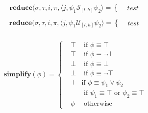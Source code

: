 \documentclass[10pt,a4paper]{article}
\newcommand{\rp}[2]{\ensuremath{\langle #1, #2 \rangle}}
\begin{document}
\begin{align*}
\mathbf{reduce}(\sigma,\tau, i,\pi,\rp{j}{\psi_1 \mathcal{S}_{[l,h]} \psi_2} = \left\{
\begin{aligned}
&test 
\end{aligned} \right. \\
\end{align*}
\begin{align*}
\mathbf{reduce}(\sigma,\tau, i,\pi,\rp{j}{\psi_1 \mathcal{U}_{[l,h]} \psi_2} = \left\{
\begin{aligned}
&test 
\end{aligned} \right. \\
\end{align*}

\begin{align*}
\mathbf{simplify}(\phi) = \left\{
\begin{aligned}
&\top &\text{ if } \phi \equiv \top \\
&\top &\text{ if } \phi \equiv \neg \bot \\
&\bot &\text{ if } \phi \equiv \bot \\
&\bot &\text{ if } \phi \equiv \neg \top \\
&\top &\text {if } \phi \equiv \psi_1 \vee \psi_2 \\
& &\text{ if } \psi_1 \equiv \top \text{ or } \psi_2 \equiv \top \\
&\phi &\text{ otherwise}
\end{aligned} \right. \\
\end{align*}

\end{document}
